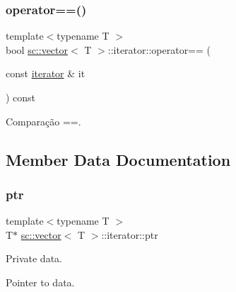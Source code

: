 \mbox{\label{classsc_1_1vector_1_1iterator_ab635a96af6c0bcc3fe888e2568287df1}} 
\subsubsection{\texorpdfstring{operator==()}{operator==()}}
{\footnotesize\ttfamily template$<$typename T $>$ \\
bool \hyperlink{classsc_1_1vector}{sc\+::vector}$<$ T $>$\+::iterator\+::operator== (\begin{DoxyParamCaption}\item[{const \hyperlink{classsc_1_1vector_1_1iterator}{iterator} \&}]{it }\end{DoxyParamCaption}) const\hspace{0.3cm}{\ttfamily [inline]}}



Comparação ==. 



\subsection{Member Data Documentation}
\mbox{\label{classsc_1_1vector_1_1iterator_a8f6a0c77f66fe2331b1837b341c08dc5}} 
\subsubsection{\texorpdfstring{ptr}{ptr}}
{\footnotesize\ttfamily template$<$typename T $>$ \\
T$\ast$ \hyperlink{classsc_1_1vector}{sc\+::vector}$<$ T $>$\+::iterator\+::ptr\hspace{0.3cm}{\ttfamily [private]}}



Private data. 

Pointer to data. 